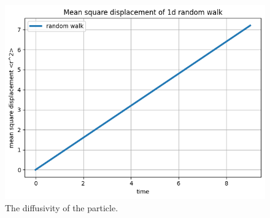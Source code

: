 \documentclass{assignmeownt}
\begin{document}
\begin{figure}
  \centering
  \includegraphics[width=0.5\linewidth]{../block1/4-RandomWalk1D/Results/Figure_4.png}
  \caption{The diffusivity of the particle.}
  \label{fig:diffusivity_random_walk_impeded}
\end{figure}
\end{document}
